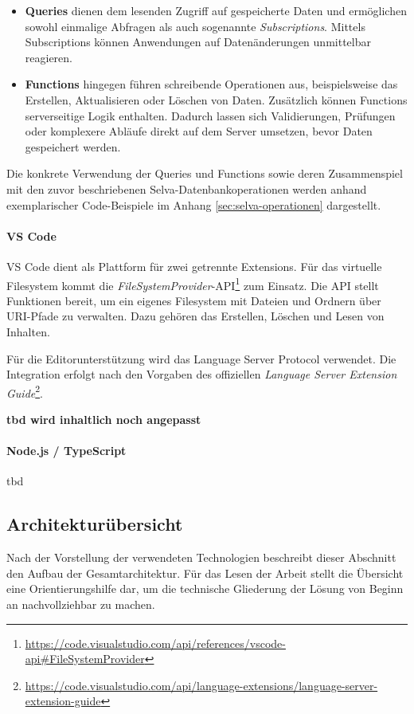 \begin{itemize} 
\item \textbf{Queries} dienen dem lesenden Zugriff auf gespeicherte Daten und ermöglichen sowohl einmalige Abfragen als auch sogenannte \textit{Subscriptions}. Mittels Subscriptions können Anwendungen auf Datenänderungen unmittelbar reagieren.

\item \textbf{Functions} hingegen führen schreibende Operationen aus, beispielsweise das Erstellen, Aktualisieren oder Löschen von Daten. Zusätzlich können Functions serverseitige Logik enthalten. Dadurch lassen sich Validierungen, Prüfungen oder komplexere Abläufe direkt auf dem Server umsetzen, bevor Daten gespeichert werden.
\end{itemize}



Die konkrete Verwendung der Queries und Functions sowie deren Zusammenspiel mit den zuvor beschriebenen Selva-Datenbankoperationen werden anhand exemplarischer Code-Beispiele im Anhang \ref{sec:selva-operationen} dargestellt.

\paragraph{VS Code}
VS Code dient als Plattform für zwei getrennte Extensions. Für das virtuelle Filesystem kommt die \textit{FileSystemProvider}-API\footnote{\url{https://code.visualstudio.com/api/references/vscode-api\#FileSystemProvider}} zum Einsatz. Die API stellt Funktionen bereit, um ein eigenes Filesystem mit Dateien und Ordnern über URI-Pfade zu verwalten. Dazu gehören das Erstellen, Löschen und Lesen von Inhalten. 

Für die Editorunterstützung wird das Language Server Protocol verwendet. Die Integration erfolgt nach den Vorgaben des offiziellen \textit{Language Server Extension Guide}\footnote{\url{https://code.visualstudio.com/api/language-extensions/language-server-extension-guide}}.

\textbf{tbd wird inhaltlich noch angepasst}

\paragraph{Node.js / TypeScript}
tbd

\pagebreak
\subsection{Architekturübersicht}
Nach der Vorstellung der verwendeten Technologien beschreibt dieser Abschnitt den Aufbau der Gesamtarchitektur. Für das Lesen der Arbeit stellt die Übersicht eine Orientierungshilfe dar, um die technische Gliederung der Lösung von Beginn an nachvollziehbar zu machen.


